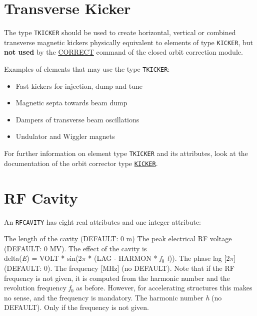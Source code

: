 \section{Transverse Kicker}
\label{sec:tkicker}

The type \texttt{TKICKER} should be used to create horizontal, vertical or
combined transverse magnetic kickers physically equivalent to elements of type
\texttt{KICKER}, but \textbf{not used} by the \hyperref[sec:correct]{CORRECT} 
command of the closed orbit correction module.

Examples of elements that may use the type \texttt{TKICKER}: 
\begin{itemize}
   \item Fast kickers for injection, dump and tune
   \item Magnetic septa towards beam dump
   \item Dampers of transverse beam oscillations
   \item Undulator and Wiggler magnets
\end{itemize}

For further information on element type \texttt{TKICKER} and its attributes, look
at the documentation of the orbit corrector type
\hyperref[sec:kicker]{\texttt{KICKER}}.   

\section{RF Cavity}
\label{sec:rf-cavity}\label{sec:rfcavity}




An \texttt{RFCAVITY} has eight real attributes and one integer attribute: 
\begin{madlist}
    The length of the cavity (DEFAULT: 0 m) 
    The peak electrical RF voltage (DEFAULT: 0 MV). The effect of 
   the cavity is \\
     delta(\textit{E}) = VOLT * sin(2$\pi$ * (LAG - HARMON * \textit{f$_0$ t})). 
    The phase lag [$2\pi$] (DEFAULT: 0). 
    The frequency [MHz] (no DEFAULT). Note that if the RF
     frequency is not given, it is computed from the harmonic number and
     the revolution frequency \textit{f$_0$} as before. However, for
     accelerating structures this makes no sense, and the frequency is
     mandatory.  
    The harmonic number \textit{h} (no DEFAULT). Only if
     the frequency is not given.  
\end{madlist}

